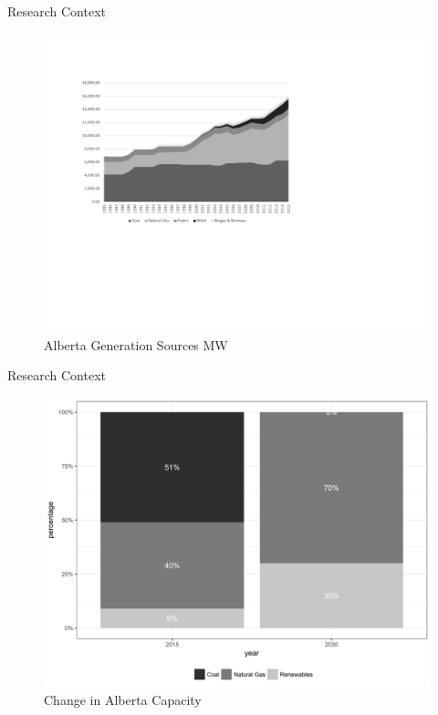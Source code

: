 \documentclass[newPxFont,numfooter,progressbar,sectionpages]{beamer}
\begin{document}

\begin{frame}[c]{Research Context}


\begin{figure}
\centering
\includegraphics[width=0.9\linewidth]{"figure/abEnSourcem"}
\caption{Alberta Generation Sources MW}
\label{fig:abensource}
\end{figure}



\end{frame}



\begin{frame}[c]{Research Context}


\begin{figure}
\centering
\includegraphics[width=0.8\linewidth]{"figure/capacity"}
\caption{Change in Alberta Capacity}
\label{fig:abcapacity}
\end{figure}



\end{frame}
\end{document}
